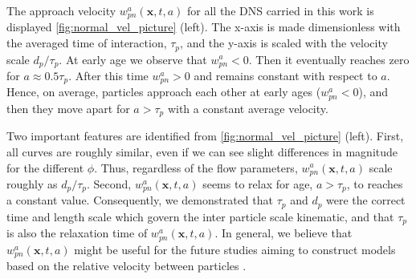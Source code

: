 The approach velocity $w_{pn}^a(\textbf{x},t,a)$ for all the DNS carried in this work is displayed \ref{fig:normal_vel_picture} (left). 
The x-axis is made dimensionless with the averaged time of interaction, $\tau_p$, and the y-axis is scaled with the velocity scale $d_p /\tau_p$. 
At  early age we observe that $w_{pn}^a<0$.
Then it eventually reaches zero for  $a \approx 0.5\tau_p$.
After this time $w_{pn}^a>0$ and remains constant with respect to $a$. 
Hence, on average, particles approach each other at early ages ($w_{pn}^a<0$), and then they move apart for $a > \tau_p$ with a constant average velocity.

Two important features are identified from \ref{fig:normal_vel_picture} (left).
First, all curves are roughly similar, even if we can see slight differences in magnitude for the different $\phi$. 
Thus, regardless of the flow parameters, $w_{pn}^a(\textbf{x},t,a)$ scale roughly as $d_p /\tau_p$. 
Second,  $w_{pn}^a(\textbf{x},t,a)$ seems to relax for age, $a > \tau_p$, to reaches a constant value. 
Consequently, we demonstrated that $\tau_p$ and $d_p$ were the correct time and length scale which govern the inter particle scale kinematic, and that $\tau_p$ is also the relaxation time of $w_{pn}^a(\textbf{x},t,a)$. 
In general, we believe that $w_{pn}^a(\textbf{x},t,a)$ might be useful for the future studies aiming to construct models based on the relative velocity between particles \citep{rao2008introduction}. 

